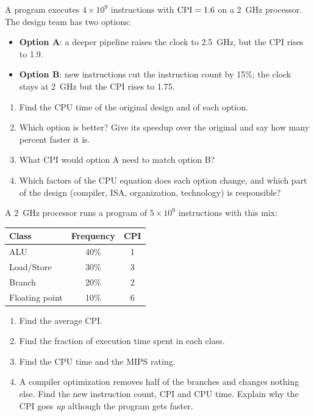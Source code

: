\begin{exercise}\label{q:intro-design}
A program executes $4\times10^9$ instructions with $\mathrm{CPI}=1.6$ on a 2~GHz
processor. The design team has two options:
\begin{itemize}[leftmargin=*]
  \item \textbf{Option A}: a deeper pipeline raises the clock to 2.5~GHz, but
  the CPI rises to 1.9.
  \item \textbf{Option B}: new instructions cut the instruction count by 15\%;
  the clock stays at 2~GHz but the CPI rises to 1.75.
\end{itemize}
\begin{enumerate}[label=(\alph*),leftmargin=*]
  \item Find the CPU time of the original design and of each option.
  \item Which option is better? Give its speedup over the original and say how
  many percent faster it is.
  \item What CPI would option A need to match option B?
  \item Which factors of the CPU equation does each option change, and which
  part of the design (compiler, ISA, organization, technology) is responsible?
\end{enumerate}
\end{exercise}

\begin{exercise}\label{q:intro-mix}
A 2~GHz processor runs a program of $5\times10^9$ instructions with this mix:
\begin{center}
\begin{tabular}{@{}lcc@{}}
\toprule
Class & Frequency & CPI \\
\midrule
ALU & 40\% & 1 \\
Load/Store & 30\% & 3 \\
Branch & 20\% & 2 \\
Floating point & 10\% & 6 \\
\bottomrule
\end{tabular}
\end{center}
\begin{enumerate}[label=(\alph*),leftmargin=*]
  \item Find the average CPI.
  \item Find the fraction of execution time spent in each class.
  \item Find the CPU time and the MIPS rating.
  \item A compiler optimization removes half of the branches and changes nothing
  else. Find the new instruction count, CPI and CPU time. Explain why the CPI
  goes \emph{up} although the program gets faster.
\end{enumerate}
\end{exercise}

